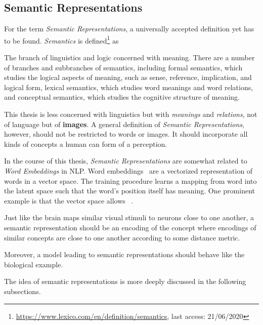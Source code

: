 \subsection{Semantic Representations}\label{subsec:semantic-representations}
For the term \textit{Semantic Representations}, a universally accepted definition yet has to be found.
\textit{Semantics} is defined\footnote{\href{https://www.lexico.com/en/definition/semantics}{https://www.lexico.com/en/definition/semantics}, last access: 21/06/2020} as
\begin{displayquote}
    The branch of linguistics and logic concerned with meaning. There are a number of branches and subbranches of semantics, including formal semantics, which studies the logical aspects of meaning, such as sense, reference, implication, and logical form, lexical semantics, which studies word meanings and word relations, and conceptual semantics, which studies the cognitive structure of meaning.
\end{displayquote}
This thesis is less concerned with linguistics but with \textit{meanings} and \textit{relations}, not of language but of \textbf{images}.
A general definition of \textit{Semantic Representations}, however, should not be restricted to words or images.
It should incorporate all kinds of concepts a human can form of a perception.

In the course of this thesis, \textit{Semantic Representations} are somewhat related to \textit{Word Embeddings} in \ac{NLP}.
Word embeddings~\citep{mikolov2013efficient} are a vectorized representation of words in a vector space.
The training procedure learns a mapping from word into the latent space such that the word's position itself has meaning.
One prominent example is that the vector space allows ~\citep{mikolov2013efficient}.

Just like the brain maps similar visual stimuli to neurons close to one another, a semantic representation should be an encoding of the concept where encodings of similar concepts are close to one another according to some distance metric.

Moreover, a model leading to semantic representations should behave like the biological example.

The idea of semantic representations is more deeply discussed in the following subsections.

